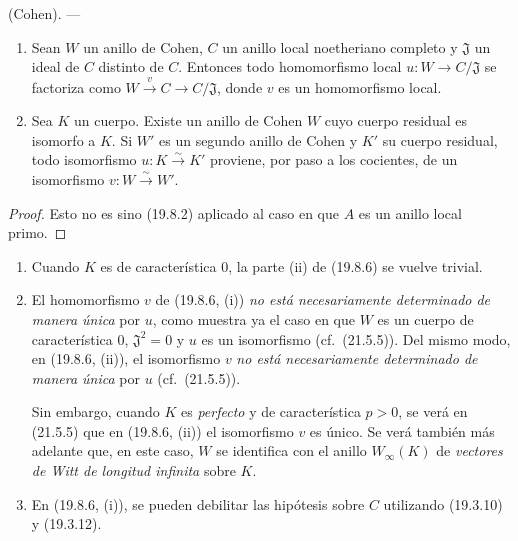 \begin{theorem}[19.8.6]
\label{0.19.8.6-fr}
\textup{(Cohen).} ---
\begin{enumerate}
  \item[\textup{(i)}] Sean $W$ un anillo de Cohen, $C$ un anillo local noetheriano
  completo y $\mathfrak J$ un ideal de $C$ distinto de $C$. Entonces todo
  homomorfismo local $u:W\to C/\mathfrak J$ se factoriza como
  $W\xrightarrow{v}C\to C/\mathfrak J$, donde $v$ es un homomorfismo local.
  \item[\textup{(ii)}] Sea $K$ un cuerpo. Existe un anillo de Cohen $W$ cuyo cuerpo
  residual es isomorfo a $K$. Si $W'$ es un segundo anillo de Cohen y $K'$ su
  cuerpo residual, todo isomorfismo $u:K\xrightarrow{\sim}K'$ proviene, por
  paso a los cocientes, de un isomorfismo $v:W\xrightarrow{\sim}W'$.
\end{enumerate}
\end{theorem}

\begin{proof}
Esto no es sino (19.8.2) aplicado al caso en que $A$ es un anillo local primo.
\end{proof}

\begin{remarks}[19.8.7]
\label{0.19.8.7-fr}
\begin{enumerate}
  \item[(i)] Cuando $K$ es de característica $0$, la parte (ii) de (19.8.6)
  se vuelve trivial.
  \item[(ii)] El homomorfismo $v$ de (19.8.6, (i)) \emph{no está
  necesariamente determinado de manera única} por $u$, como muestra ya el
  caso en que $W$ es un cuerpo de característica $0$, $\mathfrak J^2=0$ y $u$
  es un isomorfismo (cf.~(21.5.5)). Del mismo modo, en (19.8.6, (ii)), el
  isomorfismo $v$ \emph{no está necesariamente determinado de manera única}
  por $u$ (cf.~(21.5.5)).

  Sin embargo, cuando $K$ es \emph{perfecto} y de característica $p>0$, se
  verá en (21.5.5) que en (19.8.6, (ii)) el isomorfismo $v$ es único. Se verá
  también más adelante que, en este caso, $W$ se identifica con el anillo
  $W_\infty(K)$ de \emph{vectores de Witt de longitud infinita} sobre $K$.
  \item[(iii)] En (19.8.6, (i)), se pueden debilitar las hipótesis sobre $C$
  utilizando (19.3.10) y (19.3.12).
\end{enumerate}
\end{remarks}

